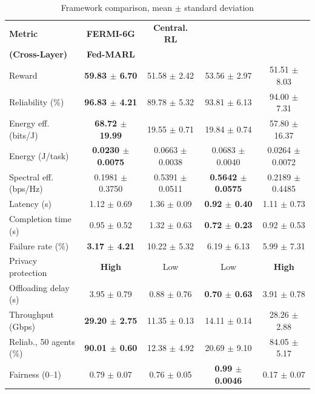 \documentclass[12pt,a4paper,final]{extreport}
\begin{document}
{\renewcommand{\arraystretch}{1.12}\setlength{\tabcolsep}{4pt}
\begin{table}[htbp]
\centering
\caption{Framework comparison, mean $\pm$ standard deviation \cite{p2}}\label{tab:p2_results}
\footnotesize
\begin{tabular}{|l|c|c|c|c|}
\hline
\textbf{Metric} & \textbf{FERMI-6G} & \textbf{Central. RL} & \shortstack{\textbf{Central. RL}\\\textbf{(Cross-Layer)}} & \textbf{Fed-MARL} \\ \hline
Reward & \textbf{59.83 $\pm$ 6.70} & 51.58 $\pm$ 2.42 & 53.56 $\pm$ 2.97 & 51.51 $\pm$ 8.03 \\ \hline
Reliability (\%) & \textbf{96.83 $\pm$ 4.21} & 89.78 $\pm$ 5.32 & 93.81 $\pm$ 6.13 & 94.00 $\pm$ 7.31 \\ \hline
Energy eff. (bits/J) & \textbf{68.72 $\pm$ 19.99} & 19.55 $\pm$ 0.71 & 19.84 $\pm$ 0.74 & 57.80 $\pm$ 16.37 \\ \hline
Energy (J/task) & \textbf{0.0230 $\pm$ 0.0075} & 0.0663 $\pm$ 0.0038 & 0.0683 $\pm$ 0.0040 & 0.0264 $\pm$ 0.0072 \\ \hline
Spectral eff. (bps/Hz) & 0.1981 $\pm$ 0.3750 & 0.5391 $\pm$ 0.0511 & \textbf{0.5642 $\pm$ 0.0575} & 0.2189 $\pm$ 0.4485 \\ \hline
Latency (s) & 1.12 $\pm$ 0.69 & 1.36 $\pm$ 0.09 & \textbf{0.92 $\pm$ 0.40} & 1.11 $\pm$ 0.73 \\ \hline
Completion time (s) & 0.95 $\pm$ 0.52 & 1.32 $\pm$ 0.63 & \textbf{0.72 $\pm$ 0.23} & 0.92 $\pm$ 0.53 \\ \hline
Failure rate (\%) & \textbf{3.17 $\pm$ 4.21} & 10.22 $\pm$ 5.32 & 6.19 $\pm$ 6.13 & 5.99 $\pm$ 7.31 \\ \hline
Privacy protection & \textbf{High} & Low & Low & \textbf{High} \\ \hline
Offloading delay (s) & 3.95 $\pm$ 0.79 & 0.88 $\pm$ 0.76 & \textbf{0.70 $\pm$ 0.63} & 3.91 $\pm$ 0.78 \\ \hline
Throughput (Gbps) & \textbf{29.20 $\pm$ 2.75} & 11.35 $\pm$ 0.13 & 14.11 $\pm$ 0.14 & 28.26 $\pm$ 2.88 \\ \hline
Reliab., 50 agents (\%) & \textbf{90.01 $\pm$ 0.60} & 12.38 $\pm$ 4.92 & 20.69 $\pm$ 9.10 & 84.05 $\pm$ 5.17 \\ \hline
Fairness (0--1) & 0.79 $\pm$ 0.07 & 0.76 $\pm$ 0.05 & \textbf{0.99 $\pm$ 0.0046} & 0.17 $\pm$ 0.07 \\ \hline
\end{tabular}
\end{table}}
\end{document}
